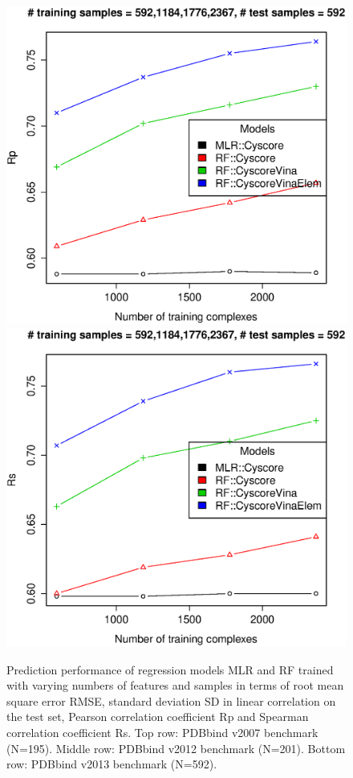\documentclass[journal=jacsat,manuscript=article]{achemso}
\begin{document}
\begin{figure}[ht!]
\includegraphics[width=\linewidth]{../rfcyscore/tst-592-pcor.eps}
\endminipage
{}
\includegraphics[width=\linewidth]{../rfcyscore/tst-592-scor.eps}
\endminipage
\caption{Prediction performance of regression models MLR and RF trained with varying numbers of features and samples in terms of root mean square error RMSE, standard deviation SD in linear correlation on the test set, Pearson correlation coefficient Rp and Spearman correlation coefficient Rs. Top row: PDBbind v2007 benchmark (N=195). Middle row: PDBbind v2012 benchmark (N=201). Bottom row: PDBbind v2013 benchmark (N=592).}
\label{fig:stat}
\end{figure}
\end{document}

